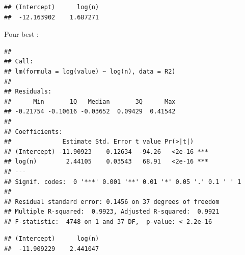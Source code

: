 \documentclass[
]{article}
\newenvironment{Shaded}{\begin{snugshade}}{\end{snugshade}}
\newcommand{\AttributeTok}[1]{\textcolor[rgb]{0.77,0.63,0.00}{#1}}
\newcommand{\DecValTok}[1]{\textcolor[rgb]{0.00,0.00,0.81}{#1}}
\newcommand{\FunctionTok}[1]{\textcolor[rgb]{0.00,0.00,0.00}{#1}}
\newcommand{\NormalTok}[1]{#1}
\newcommand{\OtherTok}[1]{\textcolor[rgb]{0.56,0.35,0.01}{#1}}
\newcommand{\SpecialCharTok}[1]{\textcolor[rgb]{0.00,0.00,0.00}{#1}}
\newcommand{\StringTok}[1]{\textcolor[rgb]{0.31,0.60,0.02}{#1}}
\begin{document}
\begin{Shaded}
\end{Shaded}

\begin{verbatim}
## (Intercept)      log(n) 
##  -12.163902    1.687271
\end{verbatim}

Pour best :

\begin{Shaded}
\end{Shaded}

\begin{verbatim}
## 
## Call:
## lm(formula = log(value) ~ log(n), data = R2)
## 
## Residuals:
##      Min       1Q   Median       3Q      Max 
## -0.21754 -0.10616 -0.03652  0.09429  0.41542 
## 
## Coefficients:
##              Estimate Std. Error t value Pr(>|t|)    
## (Intercept) -11.90923    0.12634  -94.26   <2e-16 ***
## log(n)        2.44105    0.03543   68.91   <2e-16 ***
## ---
## Signif. codes:  0 '***' 0.001 '**' 0.01 '*' 0.05 '.' 0.1 ' ' 1
## 
## Residual standard error: 0.1456 on 37 degrees of freedom
## Multiple R-squared:  0.9923, Adjusted R-squared:  0.9921 
## F-statistic:  4748 on 1 and 37 DF,  p-value: < 2.2e-16
\end{verbatim}

\begin{Shaded}
\end{Shaded}

\begin{verbatim}
## (Intercept)      log(n) 
##  -11.909229    2.441047
\end{verbatim}
\end{document}
